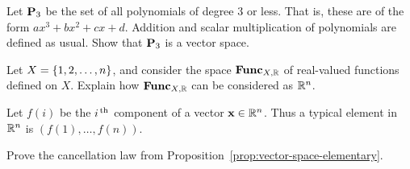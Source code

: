 \begin{ex}
  Let $\mathbf{P}_3$ be the set of all polynomials of degree 3 or
  less. That is, these are of the form $ax^3+bx^2+cx+d$. Addition and
  scalar multiplication of polynomials are defined as usual.  Show
  that $\mathbf{P}_3$ is a vector space.
\end{ex}

\begin{ex}
  Let $X=\left\{1,2,\ldots,n\right\}$, and consider the space $\mathbf{Func}_{X,\mathbb{R}}$ of
  real-valued functions defined on $X$. Explain how $\mathbf{Func}_{X,\mathbb{R}}$ can be
  considered as $\mathbb{R}^n$.
  \begin{sol}
    Let $f(i)$ be the $i^{\,\rm th}$ component of a vector
    $\vect{x}\in\R^n$. Thus a typical element in $\mathbb{R}^n$ is
    $(f(1),\ldots,f(n))$.
  \end{sol}
\end{ex}

\begin{ex}
  Prove the cancellation law from
  Proposition~\ref{prop:vector-space-elementary}.
\end{ex}
